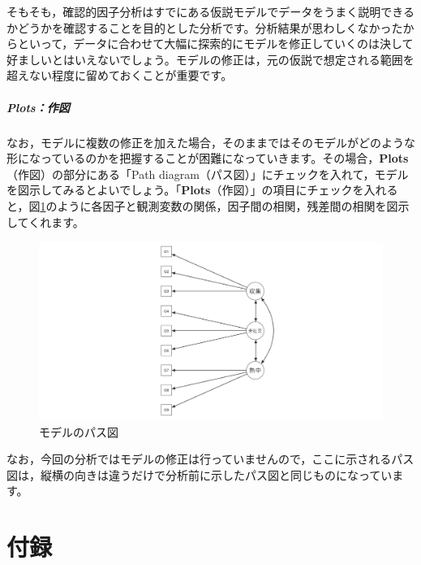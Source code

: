 \documentclass[
  12pt,
  a5jpaper,
  lualatex, ja=standard]{bxjsbook}
\begin{document}
そもそも，確認的因子分析はすでにある仮説モデルでデータをうまく説明できるかどうかを確認することを目的とした分析です。分析結果が思わしくなかったからといって，データに合わせて大幅に探索的にモデルを修正していくのは決して好ましいとはいえないでしょう。モデルの修正は，元の仮説で想定される範囲を超えない程度に留めておくことが重要です。

\hypertarget{plotsux4f5cux56f3}{%
\subsubsection*{Plots：作図}\label{plotsux4f5cux56f3}}

なお，モデルに複数の修正を加えた場合，そのままではそのモデルがどのような形になっているのかを把握することが困難になっていきます。その場合，\textbf{Plots}（作図）の部分にある「Path diagram（パス図）」にチェックを入れて，モデルを図示してみるとよいでしょう。「\textbf{Plots}（作図）」の項目にチェックを入れると，図\ref{fig:factor-cfa-plots-diagram}のように各因子と観測変数の関係，因子間の相関，残差間の相関を図示してくれます。

\clearpage

\begin{figure}[!ht]

{\centering \includegraphics[width=1\linewidth]{images/factor/cfa-plots-diagram} 

}

\caption{モデルのパス図}\label{fig:factor-cfa-plots-diagram}
\end{figure}

なお，今回の分析ではモデルの修正は行っていませんので，ここに示されるパス図は，縦横の向きは違うだけで分析前に示したパス図と同じものになっています。

\hypertarget{part-three}{%
\part*{付録}\label{part-three}}
\end{document}
